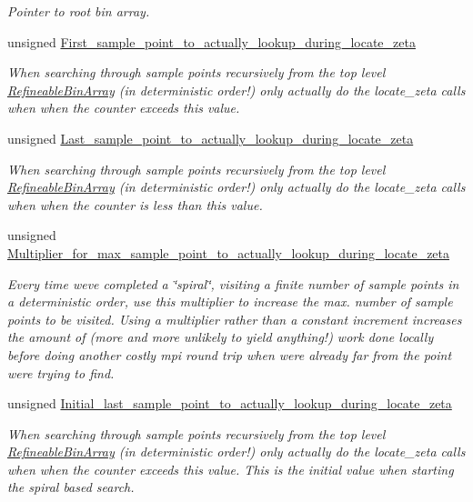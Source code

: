 \begin{DoxyCompactItemize}
\begin{DoxyCompactList}\small\item\em Pointer to root bin array. \end{DoxyCompactList}\item 
unsigned \hyperlink{classRefineableBinArray_a2eb9af06f24bef587e220675d56c5042}{First\+\_\+sample\+\_\+point\+\_\+to\+\_\+actually\+\_\+lookup\+\_\+during\+\_\+locate\+\_\+zeta}
\begin{DoxyCompactList}\small\item\em When searching through sample points recursively from the top level \hyperlink{classRefineableBinArray}{Refineable\+Bin\+Array} (in deterministic order!) only actually do the locate\+\_\+zeta calls when when the counter exceeds this value. \end{DoxyCompactList}\item 
unsigned \hyperlink{classRefineableBinArray_aa2f3e80292b0b82fc0a41815dac9958d}{Last\+\_\+sample\+\_\+point\+\_\+to\+\_\+actually\+\_\+lookup\+\_\+during\+\_\+locate\+\_\+zeta}
\begin{DoxyCompactList}\small\item\em When searching through sample points recursively from the top level \hyperlink{classRefineableBinArray}{Refineable\+Bin\+Array} (in deterministic order!) only actually do the locate\+\_\+zeta calls when when the counter is less than this value. \end{DoxyCompactList}\item 
unsigned \hyperlink{classRefineableBinArray_a058f9e44828158525e7655d4007cae76}{Multiplier\+\_\+for\+\_\+max\+\_\+sample\+\_\+point\+\_\+to\+\_\+actually\+\_\+lookup\+\_\+during\+\_\+locate\+\_\+zeta}
\begin{DoxyCompactList}\small\item\em Every time we\textquotesingle{}ve completed a \char`\"{}spiral\char`\"{}, visiting a finite number of sample points in a deterministic order, use this multiplier to increase the max. number of sample points to be visited. Using a multiplier rather than a constant increment increases the amount of (more and more unlikely to yield anything!) work done locally before doing another costly mpi round trip when we\textquotesingle{}re already far from the point we\textquotesingle{}re trying to find. \end{DoxyCompactList}\item 
unsigned \hyperlink{classRefineableBinArray_ace7075adbe1606ef0b01cbb14c380812}{Initial\+\_\+last\+\_\+sample\+\_\+point\+\_\+to\+\_\+actually\+\_\+lookup\+\_\+during\+\_\+locate\+\_\+zeta}
\begin{DoxyCompactList}\small\item\em When searching through sample points recursively from the top level \hyperlink{classRefineableBinArray}{Refineable\+Bin\+Array} (in deterministic order!) only actually do the locate\+\_\+zeta calls when when the counter exceeds this value. This is the initial value when starting the spiral based search. \end{DoxyCompactList}\end{DoxyCompactItemize}
